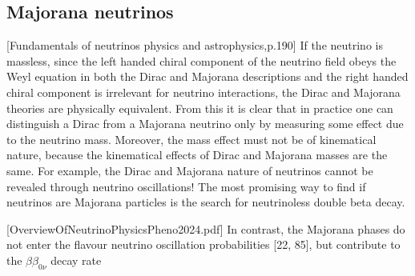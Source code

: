 \subsection{Majorana neutrinos}
[Fundamentals of neutrinos physics and astrophysics,p.190]
If the neutrino is massless, since the left handed chiral component of the neutrino field obeys the Weyl equation in both the Dirac and Majorana descriptions and the right handed chiral component is irrelevant for neutrino interactions, the Dirac and Majorana theories are physically equivalent. From this it is clear that in practice one can distinguish a Dirac from a Majorana neutrino only by measuring some effect due to the neutrino mass. Moreover, the mass effect must not be of kinematical nature, because the kinematical effects of Dirac and Majorana masses are the same. For example, the Dirac and Majorana nature of neutrinos cannot be revealed through neutrino oscillations! The most promising way to find if neutrinos are Majorana particles is the search for neutrinoless double beta decay.

[OverviewOfNeutrinoPhysicsPheno2024.pdf] In contrast, the Majorana phases do not enter the flavour neutrino oscillation probabilities [22, 85], but contribute to the $\beta\beta_{0\nu}$ decay rate